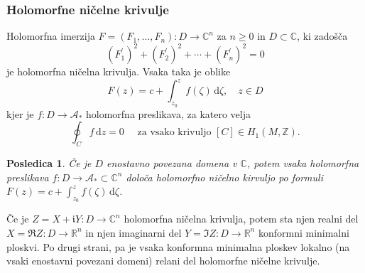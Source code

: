 \documentclass[8pt]{beamer}
\theoremstyle{definition}
\theoremstyle{remark}
\theoremstyle{plain}
\newtheorem{posledica}[definicija]{Posledica}
\numberwithin{equation}{section}  %
\begin{document}
\begin{frame}
    \frametitle{Holomorfne ničelne krivulje}

    Holomorfna imerzija $F=\left(F_1, \ldots, F_n\right): D \rightarrow \mathbb{C}^n$ za $n\geq 0$ in $D\subset \mathbb{C}$, ki zadošča  
    \begin{equation*}
        \left(F_1^{\prime}\right)^2+\left(F_2^{\prime}\right)^2+\cdots+\left(F_n^{\prime}\right)^2=0      
    \end{equation*}
    je \textcolor{red1}{holomorfna ničelna krivulja}. Vsaka taka je oblike 
    \begin{equation*}
        F(z)=c+\int_{z_0}^z f(\zeta) \, \mathrm{d} \zeta, \quad z \in D
    \end{equation*}
    kjer je $f:D \rightarrow \mathcal{A}_*$ holomorfna preslikava, za katero velja
    \begin{equation*}
        \oint_C f \, \mathrm{d} z=0 \quad \text { za vsako krivuljo } [C] \in H_1(M, \mathbb{Z}). 
    \end{equation*}
    \begin{posledica}
        Če je $D$ enostavno povezana domena v $\mathbb{C}$, potem vsaka holomorfna preslikava $f: D \rightarrow \mathcal{A}_* \subset \mathbb{C}^n$ določa holomorfno ničelno kirvuljo po formuli $F(z)=c+\int_{z_0}^z f(\zeta) \, \mathrm{d} \zeta$.  
    \end{posledica}
    Če je $Z=X+\mathfrak{i} Y: D \rightarrow \mathbb{C}^n$ holomorfna ničelna krivulja, potem sta njen realni del $X=\Re Z: D \rightarrow \mathbb{R}^n$ in njen imaginarni del $Y=\Im Z: D \rightarrow \mathbb{R}^n$ konformni minimalni ploskvi. Po drugi strani, pa je vsaka konformna minimalna ploskev lokalno (na vsaki enostavni povezani domeni) relani del holomorfne ničelne krivulje. 
    
\end{frame}
\end{document}
